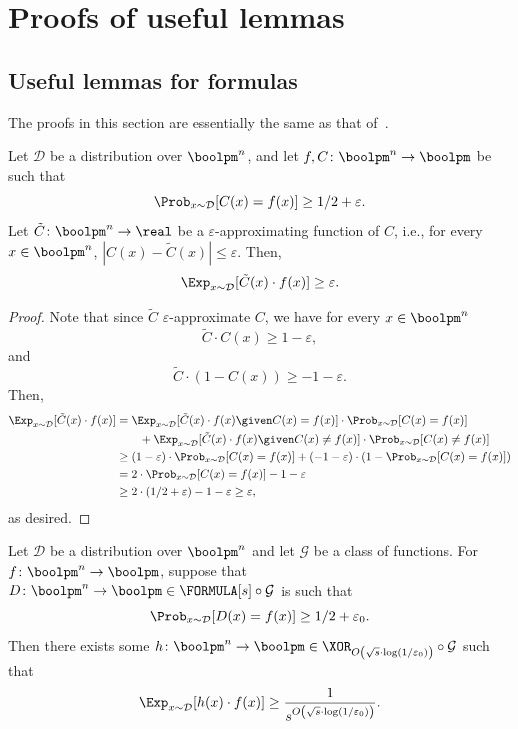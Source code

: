 \appendix
\setcounter{theorem}{49}
    \section{Proofs of useful lemmas}
    
    \subsection{Useful lemmas for formulas}\label{subsec:formula-lemmas}
    
    The proofs in this section are essentially the same as that of~\cite{Tal16}.
    
    \begin{lemma}\label{lem:lb-Tal-1-app}
	    Let $\mathcal{D}$ be a distribution over $\boolpm^n$, and let $f,C\colon\boolpm^n\to\boolpm$ be such that
	    \[
	        \Prob_{x\sim\mathcal{D}}[C(x)=f(x)]\geq 1/2+\varepsilon.
	    \] 
	    Let $\tilde{C}\colon\boolpm^n\to\real$ be a $\varepsilon$-approximating function of $C$, i.e., for every $x\in\boolpm^n$, $|C(x)-\tilde{C}(x)|\leq \varepsilon$. Then,
	    \[
	        \Exp_{x\sim\mathcal{D}}[\tilde{C}(x)\cdot f(x)]\geq \varepsilon.
	    \]
	\end{lemma}
	
	\begin{proof}
		Note that since $\tilde{C}$ $\varepsilon$-approximate $C$, we have for every $x\in\boolpm^n$
		\[
			\tilde{C}\cdot C(x)\geq 1-\varepsilon,
		\]
		and 
		\[
			\tilde{C}\cdot (1-C(x))\geq -1-\varepsilon.
		\]
		Then,
		\begin{align*}
			\Exp_{x\sim\mathcal{D}}[\tilde{C}(x)\cdot f(x)]&=\Exp_{x\sim\mathcal{D}}[\tilde{C}(x)\cdot f(x)\given C(x)=f(x)]\cdot\Prob_{x\sim\mathcal{D}}[C(x)=f(x)]\\
			&\qquad+\Exp_{x\sim\mathcal{D}}[\tilde{C}(x)\cdot f(x)\given C(x)\ne f(x)]\cdot\Prob_{x\sim\mathcal{D}}[C(x)\ne f(x)]\\
			&\geq(1-\varepsilon)\cdot \Prob_{x\sim\mathcal{D}}[C(x)=f(x)] + (-1-\varepsilon)\cdot \left(1-\Prob_{x\sim\mathcal{D}}[C(x)=f(x)]\right)\\
			&=2\cdot \Prob_{x\sim\mathcal{D}}[C(x)=f(x)] - 1 -\varepsilon\\
			&\geq 2\cdot (1/2+\varepsilon) - 1 - \varepsilon \geq \varepsilon,
		\end{align*}
		as desired.
	\end{proof}
	
	\begin{lemma}\label{lem:lb-Tal-2-app}
	    Let $\mathcal{D}$ be a distribution over $\boolpm^n$ and let $\mathcal{G}$ be a class of functions. For $f\colon\boolpm^n\to\boolpm$, suppose that $D\colon\boolpm^n\to\boolpm\in \FORMULA[s]\circ\mathcal{G}$ is such that 
	    \[
	        \Prob_{x\sim\mathcal{D}}[D(x)=f(x)]\geq 1/2+\varepsilon_0.
	    \]
	    Then there exists some $h\colon\boolpm^n\to\boolpm\in \XOR_{O\left(\sqrt{s}\cdot\log(1/\varepsilon_0)\right)}\circ \mathcal{G}$ such that
	    \[
	        \Exp_{x\sim\mathcal{D}}[h(x)\cdot f(x)]\geq \frac{1}{s^{O\left(\sqrt{s}\cdot\log(1/\varepsilon_0)\right)}}.
	    \]
	\end{lemma}
	
